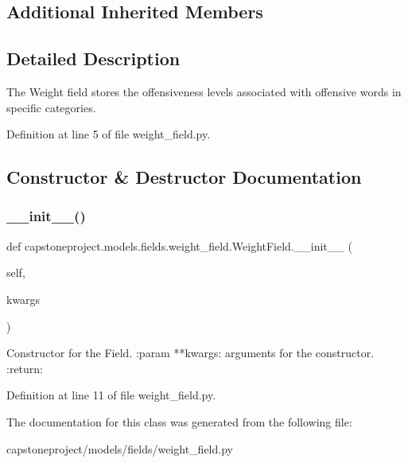 \subsection*{Additional Inherited Members}


\subsection{Detailed Description}
\begin{DoxyVerb}The Weight field stores the offensiveness levels associated
with offensive words in specific
categories.\end{DoxyVerb}
 

Definition at line 5 of file weight\+\_\+field.\+py.



\subsection{Constructor \& Destructor Documentation}
\mbox{\label{classcapstoneproject_1_1models_1_1fields_1_1weight__field_1_1_weight_field_ae67fdb2fed60a7a285d081bcf9002475}} 
\subsubsection{\texorpdfstring{\+\_\+\+\_\+init\+\_\+\+\_\+()}{\_\_init\_\_()}}
{\footnotesize\ttfamily def capstoneproject.\+models.\+fields.\+weight\+\_\+field.\+Weight\+Field.\+\_\+\+\_\+init\+\_\+\+\_\+ (\begin{DoxyParamCaption}\item[{}]{self,  }\item[{}]{kwargs }\end{DoxyParamCaption})}

\begin{DoxyVerb}Constructor for the Field.
:param **kwargs: arguments for the constructor.
:return:
\end{DoxyVerb}
 

Definition at line 11 of file weight\+\_\+field.\+py.



The documentation for this class was generated from the following file\+:\begin{DoxyCompactItemize}
\item 
capstoneproject/models/fields/weight\+\_\+field.\+py\end{DoxyCompactItemize}
